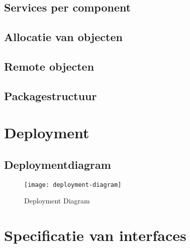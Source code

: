 \documentclass{scrreprt}
\begin{document}
	\section{Services per component}
	\section{Allocatie van objecten}
	\section{Remote objecten}
	\section{Packagestructuur}
	
	\newpage
	\chapter{Deployment}
	\section{Deploymentdiagram}
	\begin{figure}[ht]
		\centering
		\texttt{[image: deployment-diagram]}
		\label{pic:deployment-diagram}
		\caption{Deployment Diagram}
	\end{figure}
	
	\newpage
	\chapter{Specificatie van interfaces}
\end{document}
